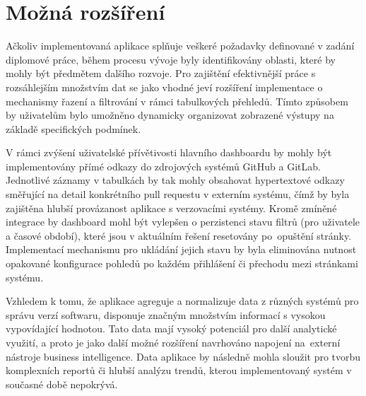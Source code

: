 \section{Možná rozšíření}
Ačkoliv implementovaná aplikace splňuje veškeré požadavky definované v zadání diplomové práce, během procesu vývoje byly identifikovány oblasti, které by mohly být předmětem dalšího rozvoje. Pro zajištění efektivnější práce s rozsáhlejším množstvím dat se jako vhodné jeví rozšíření implementace o mechanismy řazení a filtrování v rámci tabulkových přehledů. Tímto způsobem by uživatelům bylo umožněno dynamicky organizovat zobrazené výstupy na základě specifických podmínek.

V rámci zvýšení uživatelské přívětivosti hlavního dashboardu by mohly být implementovány přímé odkazy do zdrojových systémů GitHub a GitLab. Jednotlivé záznamy v tabulkách by tak mohly obsahovat hypertextové odkazy směřující na detail konkrétního pull requestu v externím systému, čímž by byla zajištěna hlubší provázanost aplikace s verzovacími systémy. Kromě zmíněné integrace by dashboard mohl být vylepšen o perzistenci stavu filtrů (pro uživatele a časové období), které jsou v aktuálním řešení resetovány po~opuštění stránky. Implementací mechanismu pro ukládání jejich stavu by byla eliminována nutnost opakované konfigurace pohledů po každém přihlášení či přechodu mezi stránkami systému.

Vzhledem k tomu, že aplikace agreguje a normalizuje data z různých systémů pro správu verzí softwaru, disponuje značným množstvím informací s vysokou vypovídající hodnotou. Tato data mají vysoký potenciál pro další analytické využití, a proto je jako další možné rozšíření navrhováno napojení na~externí nástroje business intelligence. Data aplikace by následně mohla sloužit pro tvorbu komplexních reportů či hlubší analýzu trendů, kterou implementovaný systém v současné době nepokrývá.
